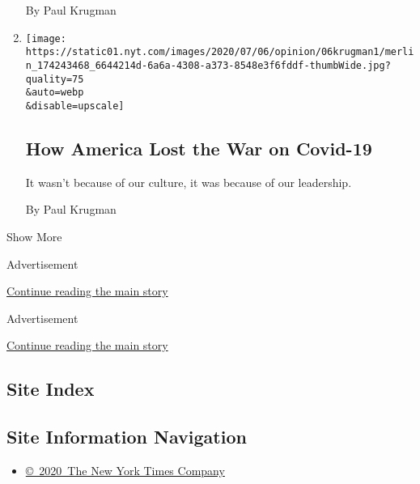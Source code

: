 \begin{enumerate}
  By Paul Krugman
\item
  \href{/2020/07/06/opinion/covid-19-trump.html}{}

  \texttt{[image: https://static01.nyt.com/images/2020/07/06/opinion/06krugman1/merlin\_174243468\_6644214d-6a6a-4308-a373-8548e3f6fddf-thumbWide.jpg?quality=75\\\&auto=webp\\\&disable=upscale]}

  \hypertarget{how-america-lost-the-war-on-covid-19}{%
  \subsection{How America Lost the War on
  Covid-19}\label{how-america-lost-the-war-on-covid-19}}

  It wasn't because of our culture, it was because of our leadership.

  By Paul Krugman
\end{enumerate}

Show More

Advertisement

\protect\hyperlink{after-mid1}{Continue reading the main story}

Advertisement

\protect\hyperlink{after-mktg}{Continue reading the main story}

\hypertarget{site-index}{%
\subsection{Site Index}\label{site-index}}

\hypertarget{site-information-navigation}{%
\subsection{Site Information
Navigation}\label{site-information-navigation}}

\begin{itemize}
\tightlist
\item
  \href{https://help.nytimes.com/hc/en-us/articles/115014792127-Copyright-notice}{©~2020~The
  New York Times Company}
\end{itemize}


